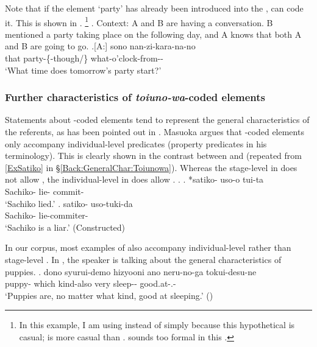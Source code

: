 Note that if the element `party' has already been introduced into the ,  can code it.
This is shown in \Next[A].%
	\footnote{
	In this example, I am using  instead of 
	simply because this hypothetical  is casual;
	 is more casual than .
	 sounds too formal in this .
	}
\ex. \label{Party}Context: A and B are having a conversation. B mentioned a party taking place on the following day, and A knows that both A and B are going to go.
	\ag.[A:] sono  nan-zi-kara-na-no \\
		that party-\{-though/\} what-o'clock-from-- \\
		`What time does tomorrow's party start?' 


\subsubsection{Further characteristics of \textit{toiuno-wa}-coded elements}\label{Par:Topic:Toiunowa:Other}

Statements about -coded elements tend to represent the general characteristics of the referents,
as has been pointed out in .
Masuoka argues that -coded elements only accompany individual-level predicates (property predicates in his terminology).
This is clearly shown in the contrast between \Next[a] and \Next[b] (repeated from \ref{ExSatiko} in \S \ref{Back:GeneralChar:Toiunowa}).
Whereas the stage-level  in \Next[a] does not allow ,
the individual-level  in \Next[b] does allow .
%
\ex.
\ag. *satiko- uso-o tui-ta \\
     Sachiko- lie- commit- \\
     `Sachiko lied.'
     \hfill{\cite[96]{masuoka12}}
\bg. satiko- uso-tuki-da \\
     Sachiko- lie-commiter- \\
     `Sachiko is a liar.'
     \hfill{(Constructed)}

In our corpus,
most examples of  also accompany individual-level 
rather than stage-level .
In \Next,
the speaker is talking about the general characteristics of puppies.
%
\exg.  dono syurui-demo hizyooni ano neru-no-ga tokui-desu-ne \\
 puppy- which kind-also very  sleep-- good.at-.- \\
 `Puppies are, no matter what kind, good at sleeping.'
 \hfill{()}


